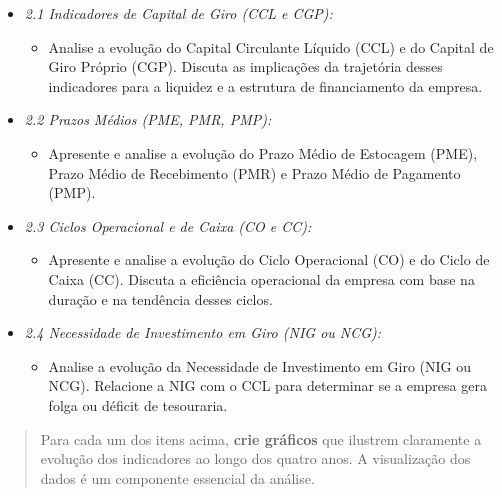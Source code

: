 \documentclass[
  a4paper,
]{book}
\providecommand{\tightlist}{%
  \setlength{\itemsep}{0pt}\setlength{\parskip}{0pt}}\usepackage{longtable,booktabs,array}
\begin{document}
\begin{itemize}
\tightlist
\item
  \emph{2.1 Indicadores de Capital de Giro (CCL e CGP):}

  \begin{itemize}
  \tightlist
  \item
    Analise a evolução do Capital Circulante Líquido (CCL) e do Capital
    de Giro Próprio (CGP). Discuta as implicações da trajetória desses
    indicadores para a liquidez e a estrutura de financiamento da
    empresa.\\
  \end{itemize}
\item
  \emph{2.2 Prazos Médios (PME, PMR, PMP):}

  \begin{itemize}
  \tightlist
  \item
    Apresente e analise a evolução do Prazo Médio de Estocagem (PME),
    Prazo Médio de Recebimento (PMR) e Prazo Médio de Pagamento (PMP).\\
  \end{itemize}
\item
  \emph{2.3 Ciclos Operacional e de Caixa (CO e CC):}

  \begin{itemize}
  \tightlist
  \item
    Apresente e analise a evolução do Ciclo Operacional (CO) e do Ciclo
    de Caixa (CC). Discuta a eficiência operacional da empresa com base
    na duração e na tendência desses ciclos.\\
  \end{itemize}
\item
  \emph{2.4 Necessidade de Investimento em Giro (NIG ou NCG):}

  \begin{itemize}
  \tightlist
  \item
    Analise a evolução da Necessidade de Investimento em Giro (NIG ou
    NCG). Relacione a NIG com o CCL para determinar se a empresa gera
    folga ou déficit de tesouraria.\\
  \end{itemize}
\end{itemize}

\begin{quote}
Para cada um dos itens acima, \textbf{crie gráficos} que ilustrem
claramente a evolução dos indicadores ao longo dos quatro anos. A
visualização dos dados é um componente essencial da análise.
\end{quote}
\end{document}
